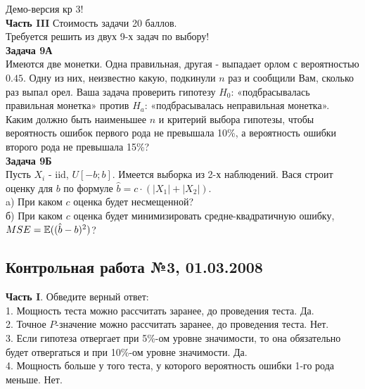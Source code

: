 \documentclass[12pt, a4paper]{article}\usepackage[]{graphicx}\usepackage[]{color}
\begin{document}
Демо-версия кр 3! \\
\textbf{Часть III} Стоимость задачи 20 баллов. \\

Требуется решить \textbf{} из двух 9-х задач по
выбору! \\

\textbf{Задача 9А} \\
Имеются две монетки. Одна правильная, другая - выпадает орлом с
вероятностью $0.45$. Одну из них, неизвестно какую, подкинули $n$
раз и сообщили Вам, сколько раз выпал орел. Ваша задача проверить
гипотезу $H_{0}$: «подбрасывалась правильная монетка» против
$H_{a}$:
«подбрасывалась неправильная монетка». \\
Каким должно быть наименьшее $n$ и критерий выбора гипотезы, чтобы
вероятность ошибок первого рода не превышала 10\%, а вероятность
ошибки второго рода не превышала 15\%? \\

\textbf{Задача 9Б} \\
Пусть $X_{i}$ - iid, $U[-b;b]$. Имеется выборка из 2-х наблюдений. Вася строит оценку для $b$ по формуле $\hat{b}=c\cdot (|X_{1}|+|X_{2}|)$. \\
a) При каком $c$ оценка будет несмещенной? \\
б) При каком $c$ оценка будет минимизировать средне-квадратичную ошибку, $MSE=\mathbb{E}((\hat{b}-b)^{2})$? \\


\subsection{Контрольная работа №3, 01.03.2008}

\textbf{Часть I}. Обведите верный ответ: \\

1. Мощность теста можно рассчитать заранее, до проведения теста. Да.  \\

2. Точное $P$-значение можно рассчитать заранее, до проведения теста. Нет. \\

3. Если гипотеза отвергает при 5\%-ом уровне значимости, то
она обязательно будет отвергаться и при 10\%-ом уровне значимости. Да. \\

4. Мощность больше у того теста, у которого вероятность ошибки
1-го рода меньше.  Нет. \\
\end{document}
